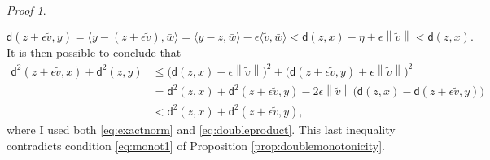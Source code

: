 \documentclass[11pt,twoside,a4paper]{article}
\newcommand{\scal}[2]{\ensuremath{\langle #1 , #2 \rangle}} %
\newcommand{\norm}[1]{\left\lVert#1\right\rVert}
\newcommand{\thmsymbol}{\( \square \)}
\newcommand{\di}{\mathsf d} %
\theoremstyle{theorem}
\theoremstyle{definition}
\theoremstyle{remark}
\theoremstyle{proof}
\newtheorem*{pro}{Proof}
\newenvironment{pr}{\begin{pro}%
 \renewcommand{\qedsymbol}{\thmsymbol}\pushQED{\qed}}%
 {\popQED\end{pro}}
\begin{document}
\begin{pr}
\begin{itemize}
   \begin{equation}\label{eq:doubleproduct}
       \di(z+\epsilon\tilde v, y)= \scal{y-(z+\epsilon\tilde v)}{\bar w} = \scal{y-z}{\bar w}-\epsilon\scal{\tilde v}{\bar w}<\di (z,x) - \eta  + \epsilon \norm{\tilde v}<\di (z,x).
   \end{equation}
   It is then possible to conclude that 
   \begin{align*}
       \di^2 (z+\epsilon\tilde v, x) + \di^2 (z,y) &\leq \big(\di (z,x) - \epsilon \norm{\tilde v} \big)^2 + \big(\di (z+\epsilon\tilde v, y)+ \epsilon \norm{\tilde v}\big)^2 \\
       & = \di^2 (z,x) + \di^2(z+\epsilon\tilde v, y) - 2 \epsilon \norm{\tilde v}\big( \di (z,x) - \di (z+\epsilon\tilde v, y) \big)\\
       &< \di^2 (z,x) + \di^2(z+\epsilon\tilde v, y),
   \end{align*}
   where I used both \eqref{eq:exactnorm} and \eqref{eq:doubleproduct}. This last inequality contradicts condition \eqref{eq:monot1} of Proposition \ref{prop:doublemonotonicity}.
\end{itemize}
 

\end{pr}
\end{document}
